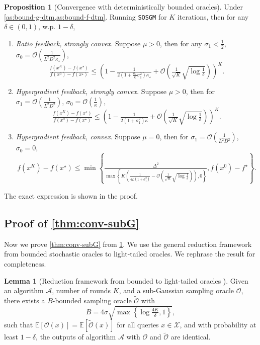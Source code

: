 \documentclass{article}
\theoremstyle{definition}
\newtheorem{lemma}[lemma]{Lemma}
\newtheorem{proposition}[proposition]{Proposition}
\newcommand{\sosgm}{\texttt{SOSGM}}
\begin{document}
\begin{proposition}[Convergence with deterministically bounded oracles]
  \label{prop:conv-dtm}
  Under \cref{as:bound-g-dtm,as:bound-f-dtm}. Running {\sosgm} for $K$
  iterations, then for any $\delta \in (0, 1)$, w.p. $1 - \delta$,
  \begin{enumerate}
    \item {\emph{Ratio feedback, strongly convex.}} Suppose $\mu > 0$, then
    for any $\sigma_1 < \tfrac{1}{2}$, $\sigma_0 =\mathcal{O} \left(
    \tfrac{1}{L^2 D^2 \kappa_{\star}} \right)$,
    \[ \tfrac{f (x^{K}) - f (x^{\star})}{f (x^0) - f (x^{\star})} \leq
       \left( 1 - \tfrac{1}{2 \left( 1 + \tfrac{\kappa_{\star}}{\kappa}
       \sigma_1^2  \right) \kappa_{\star}} + \mathcal{O} \left(
       \tfrac{1}{\sqrt{K}} \sqrt{\log \tfrac{1}{\delta}} \right) \right)^K .
    \]
    \item {\emph{Hypergradient feedback, strongly convex.}} Suppose $\mu > 0$,
    then for $\sigma_1 =\mathcal{O} \left( \tfrac{1}{L^2 D^2} \right)$,
    $\sigma_0 =\mathcal{O} \left( \tfrac{1}{\kappa} \right)$,
    \[ \tfrac{f (x^{K}) - f (x^{\star})}{f (x^0) - f (x^{\star})} \leq
       \left( 1 - \tfrac{1}{2 (1 + \sigma_1^2 ) \kappa} + \mathcal{O} \left(
       \tfrac{1}{\sqrt{K}} \sqrt{\log \tfrac{1}{\delta}} \right) \right)^K .
    \]
    \item {\emph{Hypergradient feedback, convex.}} Suppose $\mu = 0$, then for
    $\sigma_1 =\mathcal{O} \left( \tfrac{1}{L^2 D^2} \right)$, $\sigma_0 = 0$,
    \[ f (x^{K}) - f (x^{\star}) \leq \min \left\{ \tfrac{\Delta^2}{\max
       \left\{ K \left( \frac{1}{4 L (1 + \sigma_1^2)} - \mathcal{O} \left(
       \tfrac{1}{\sqrt{K}} \sqrt{\log \tfrac{1}{\delta}} \right) \right), 0
       \right\}}, f (x^0) - f^{\star} \right\} . \]
  \end{enumerate}
  The exact expression is shown in the proof.
\end{proposition}


\subsection{Proof of \cref{thm:conv-subG}}
Now we prove \cref{thm:conv-subG} from \cref{prop:conv-dtm}. We use the general
reduction framework from bounded stochastic oracles to light-tailed oracles.
We rephrase the result for completeness.

\begin{lemma}[Reduction framework from bounded to light-tailed oracles \cite{attia2024note}]
  \label{lem:bdd-ltail}
  Given an algorithm $\mathcal{A}$, number of rounds $K$,
  and a sub-Gaussian sampling oracle $\mathcal{O}$, there exists a $B$-bounded
  sampling oracle $\widetilde{\mathcal{O}}$ with
  \[ B = 4 \sigma \sqrt{\max \left\{ \log \tfrac{4 K}{\delta}, 1 \right\}}, \]
  such that $\mathbb{E} [\mathcal{O} (x)] =\mathbb{E} [\widetilde{\mathcal{O}}
  (x)]$ for all queries $x \in \mathcal{X}$, and with probability at least $1
  - \delta$, the outputs of algorithm $\mathcal{A}$ with $\mathcal{O}$ and
  $\widetilde{\mathcal{O}}$ are identical.
\end{lemma}
\end{document}
